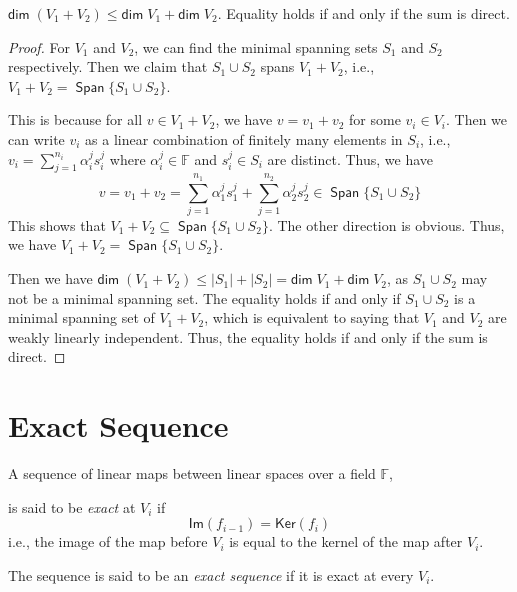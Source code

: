 \documentclass[
	11pt, %
	fleqn, %
	a4paper, %
]{LegrandOrangeBook}
\renewcommand{\ker}[1]{\mathsf{Ker}(#1)} %
\renewcommand{\Im}[1]{\mathsf{Im}(#1)} %
\newcommand{\F}{\mathbb{F}} %
\renewcommand{\dim}{\mathsf{dim\;}} %
\DeclareMathOperator{\Span}{\mathsf{Span}}
\begin{document}
\begin{proposition} \label{prop:dimension_of_sum_of_subspaces}
    $\dim{(V_1 + V_2)} \leq \dim{V_1} + \dim{V_2}$. Equality holds if and only if the sum is direct.
\end{proposition}

\begin{proof}
    For $V_1$ and $V_2$, we can find the minimal spanning sets $S_1$ and $S_2$ respectively. Then we claim that $S_1 \cup S_2$ spans $V_1 + V_2$, i.e., $V_1 + V_2 = \Span\{S_1 \cup S_2\}$. 
    
    This is because for all $v \in V_1 + V_2$, we have $v = v_1 + v_2$ for some $v_i \in V_i$. Then we can write $v_i$ as a linear combination of finitely many elements in $S_i$, i.e., $v_i = \sum_{j=1}^{n_i} \alpha_i^j s_i^j$ where $\alpha_i^j \in \F$ and $s_i^j \in S_i$ are distinct. Thus, we have 
    \[
        v = v_1 + v_2 = \sum_{j=1}^{n_1} \alpha_1^j s_1^j + \sum_{j=1}^{n_2} \alpha_2^j s_2^j \in \Span\{S_1 \cup S_2\}
    \]
    This shows that $V_1 + V_2 \subseteq \Span\{S_1 \cup S_2\}$. The other direction is obvious. Thus, we have $V_1 + V_2 = \Span\{S_1 \cup S_2\}$.

    Then we have $\dim{(V_1 + V_2)} \leq |S_1| + |S_2| = \dim{V_1} + \dim{V_2}$, as $S_1 \cup S_2$ may not be a minimal spanning set. The equality holds if and only if $S_1 \cup S_2$ is a minimal spanning set of $V_1 + V_2$, which is equivalent to saying that $V_1$ and $V_2$ are weakly linearly independent. Thus, the equality holds if and only if the sum is direct.
\end{proof}

\newpage

\section{Exact Sequence}

\begin{definition}
    A sequence of linear maps between linear spaces over a field $\F$,
    \begin{center}
    \end{center}
    is said to be \emph{exact} at $V_i$ if 
    \[ \Im{f_{i-1}} = \ker{f_i} \]
    i.e., the image of the map before $V_i$ is equal to the kernel of the map after $V_i$.

    The sequence is said to be an \emph{exact sequence} if it is exact at every $V_i$.
\end{definition}
\end{document}
